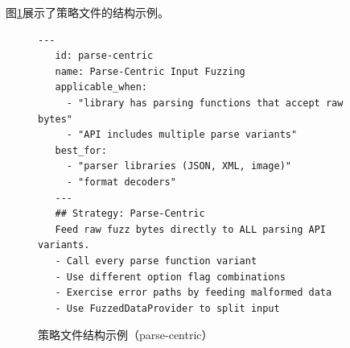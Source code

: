 \begin{table}[H]
    \centering
    \caption{MAGIC4FDG策略库（10种策略）}
    \label{tab:strategy-lib}
\end{table}

图\ref{fig:strategy-format}展示了策略文件的结构示例。

\begin{figure}[H]
    \centering
    \begin{lstlisting}[style=style@base]
   ---
   id: parse-centric
   name: Parse-Centric Input Fuzzing
   applicable_when:
     - "library has parsing functions that accept raw bytes"
     - "API includes multiple parse variants"
   best_for:
     - "parser libraries (JSON, XML, image)"
     - "format decoders"
   ---
   ## Strategy: Parse-Centric
   Feed raw fuzz bytes directly to ALL parsing API variants.
   - Call every parse function variant
   - Use different option flag combinations
   - Exercise error paths by feeding malformed data
   - Use FuzzedDataProvider to split input
    \end{lstlisting}
    \caption{策略文件结构示例（parse-centric）}
    \label{fig:strategy-format}
\end{figure}

